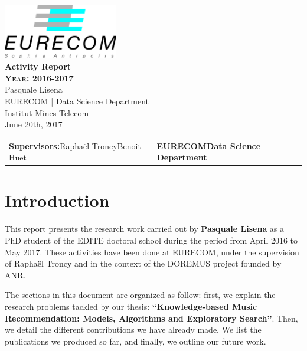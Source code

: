 \documentclass[a4paper,11pt]{report}
\begin{document}
\begin{titlepage}
\begin{center}
\includegraphics[width=5cm]{EURECOM_logo_quadri_300dpi}
\\[3cm]
\textbf{\Huge{Activity Report}}
\\[2cm]
\textbf{\textsc{\LARGE{Year: 2016-2017}}}
\\[0.5cm]
\LARGE{Pasquale Lisena}
\\[0.5cm]
\small{EURECOM | Data Science Department}
\\
\large{Institut Mines-Telecom}
\\
\large{June 20th, 2017}
\\[8cm]
\begin{tabular}{p{8.5cm} p{8.5cm}}
 \small{\textbf{Supervisors:}\newline Rapha\"el Troncy\newline Benoit Huet}
&
 \small{\textbf{EURECOM\newline Data Science Department}}
\end{tabular}
\end{center}
\end{titlepage}


\chapter{Introduction}

This report presents the research work carried out by \textbf{Pasquale Lisena} as a PhD student of the EDITE doctoral school during the period from April 2016 to May 2017. These activities have been done at EURECOM, under the supervision of Rapha\"el Troncy and in the context of the DOREMUS project founded by ANR.

The sections in this document are organized as follow: first, we explain the research problems tackled by our thesis: \textbf{``Knowledge-based Music Recommendation: Models, Algorithms and Exploratory Search''}. Then, we detail the different contributions we have already made. We list the publications we produced so far, and finally, we outline our future work.
\end{document}
